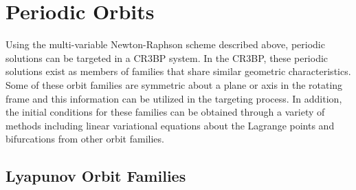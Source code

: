\section{Periodic Orbits}
Using the multi-variable Newton-Raphson scheme described above, periodic solutions can be targeted
in a CR3BP system. In the CR3BP, these periodic solutions exist as members of families that share
similar geometric characteristics. Some of these orbit families are symmetric about a plane or axis
in the rotating frame and this information can be utilized in the targeting process. In addition,
the initial conditions for these families can be obtained through a variety of methods including
linear variational equations about the Lagrange points and bifurcations from other orbit families.

\subsection{Lyapunov Orbit Families}
